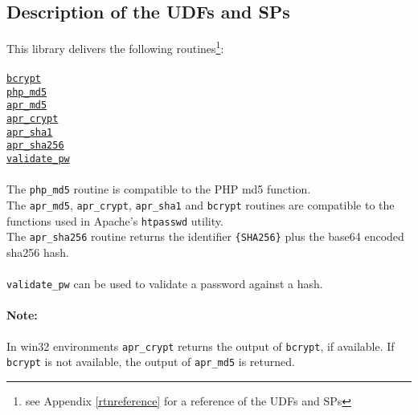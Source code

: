 \subsection{Description of the UDFs and SPs}
This library delivers the following routines\footnote{see Appendix \ref{rtnreference} for a reference of the UDFs and SPs}:\\
\\
\hyperlink{hbcrypt}{\tt bcrypt}\\
\hyperlink{hphpmd5}{\tt php\_md5}\\
\hyperlink{haprmd5}{\tt apr\_md5}\\
\hyperlink{haprcrypt}{\tt apr\_crypt}\\
\hyperlink{haprsha1}{\tt apr\_sha1}\\
\hyperlink{haprsha256}{\tt apr\_sha256}\\
\hyperlink{hvalidatepw}{\tt validate\_pw}\\
\\
The {\tt php\_md5} routine is compatible to the PHP md5 function.\\
The {\tt apr\_md5}, {\tt apr\_crypt}, {\tt apr\_sha1} and {\tt bcrypt} routines are compatible to the functions used in Apache's {\tt htpasswd} utility.\\
The {\tt apr\_sha256} routine returns the identifier {\tt \{SHA256\}} plus the base64 encoded sha256 hash.\\
\\
{\tt validate\_pw} can be used to validate a password against a hash.
\paragraph{Note:}{In win32 environments {\tt apr\_crypt} returns the output of {\tt bcrypt}, if available. If {\tt bcrypt} is not available, the output of {\tt apr\_md5} is returned.}